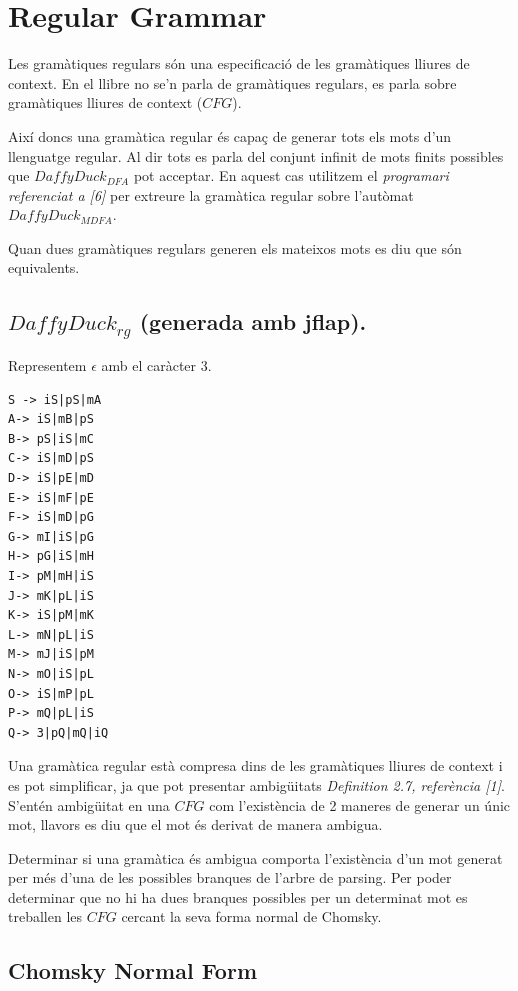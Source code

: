 \documentclass[12pt,a4paper]{report}
\def \dfa{$DaffyDuck_{DFA} $}
\def \mfa{$DaffyDuck_{MDFA} $}
\def \rg{$DaffyDuck_{rg} $}
\def \cfg{$CFG$}
\begin{document}
\section{Regular Grammar}

Les gramàtiques regulars són una especificació de les gramàtiques lliures de context. En el llibre no se’n parla de gramàtiques regulars, es parla sobre gramàtiques lliures de context (\cfg{}).

Així doncs una gramàtica regular és capaç de generar tots els mots d’un llenguatge regular. Al dir tots es parla del conjunt infinit de mots finits possibles que \dfa{} pot acceptar. En aquest cas utilitzem el \textit{programari referenciat a [6]} per extreure la gramàtica regular sobre l’autòmat \mfa{}.

\begin{center}
Quan dues gramàtiques regulars generen els mateixos mots es diu que són equivalents.
\end{center}

\subsection{\rg{} (generada amb jflap).}

Representem $\epsilon$ amb el caràcter 3.

\begin{lstlisting}
S -> iS|pS|mA
A-> iS|mB|pS
B-> pS|iS|mC
C-> iS|mD|pS
D-> iS|pE|mD
E-> iS|mF|pE
F-> iS|mD|pG
G-> mI|iS|pG
H-> pG|iS|mH
I-> pM|mH|iS
J-> mK|pL|iS
K-> iS|pM|mK
L-> mN|pL|iS
M-> mJ|iS|pM
N-> mO|iS|pL
O-> iS|mP|pL
P-> mQ|pL|iS
Q-> 3|pQ|mQ|iQ
\end{lstlisting}

Una gramàtica regular està compresa dins de les gramàtiques lliures de context i es pot simplificar, ja que pot presentar ambigüitats \textit{Definition 2.7, referència [1]}. S’entén ambigüitat en una $CFG$ com l’existència de 2 maneres de generar un únic mot, llavors es diu que el mot és derivat de manera ambigua.

Determinar si una gramàtica és ambigua comporta l’existència d’un mot generat per més d’una de les possibles branques de l’arbre de parsing. Per poder determinar que no hi ha dues branques possibles per un determinat mot es treballen les $CFG$ cercant la seva forma normal de Chomsky.

\subsection{Chomsky Normal Form}
\end{document}

